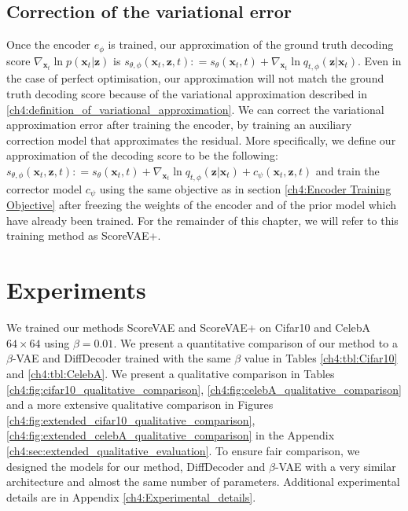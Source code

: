 \subsection{Correction of the variational error}
Once the encoder $e_{\phi}$ is trained, our approximation of the ground truth decoding score $\nabla_{\textbf{x}_t}  \ln{p(\textbf{x}_t | \textbf{z})}$ is $s_{\theta, \phi}(\textbf{x}_t, \textbf{z}, t) : = s_\theta(\textbf{x}_t, t) + \nabla_{\textbf{x}_t} \ln q_{t, \phi}(\textbf{z} | \textbf{x}_t)$. Even in the case of perfect optimisation, our approximation will not match the ground truth decoding score because of the variational approximation described in \ref{ch4:definition_of_variational_approximation}. We can correct the variational approximation error after training the encoder, by training an auxiliary correction model that approximates the residual. More specifically, we define our approximation of the decoding score to be the following: 
$s_{\theta, \phi}(\textbf{x}_t, \textbf{z}, t) : = s_\theta(\textbf{x}_t, t) + \nabla_{\textbf{x}_t} \ln q_{t, \phi}(\textbf{z} | \textbf{x}_t)+c_{\psi}(\textbf{x}_t, \textbf{z}, t)$ and train the corrector model $c_{\psi}$ using the same objective as in section \ref{ch4:Encoder Training Objective} after freezing the weights of the encoder and of the prior model which have already been trained. For the remainder of this chapter, we will refer to this training method as ScoreVAE+.

\section{Experiments} \label{ch4:Experiments}
We trained our methods ScoreVAE and ScoreVAE+ on Cifar10 and CelebA $64\times 64$ using $\beta = 0.01$. We present a quantitative comparison of our method to a $\beta$-VAE and DiffDecoder trained with the same $\beta$ value in Tables \ref{ch4:tbl:Cifar10} and \ref{ch4:tbl:CelebA}. We present a qualitative comparison in Tables \ref{ch4:fig:cifar10_qualitative_comparison}, \ref{ch4:fig:celebA_qualitative_comparison} and a more extensive qualitative comparison in Figures \ref{ch4:fig:extended_cifar10_qualitative_comparison}, \ref{ch4:fig:extended_celebA_qualitative_comparison} in the Appendix \ref{ch4:sec:extended_qualitative_evaluation}. To ensure fair comparison, we designed the models for our method, DiffDecoder and $\beta$-VAE with a very similar architecture and almost the same number of parameters. Additional experimental details are in Appendix \ref{ch4:Experimental_details}. 

